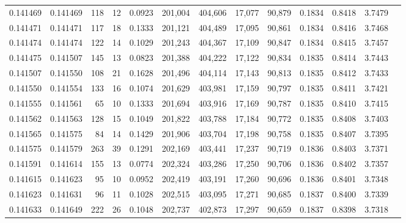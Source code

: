 \begin{tabular}{rrrrrrrrrrrrr}
0.141469 & 0.141469 &   118 &  12 &                                     0.0923 & 201,004 & 404,606 &  17,077 &  90,879 & 0.1834 & 0.8418 & 3.7479 \\
0.141471 & 0.141471 &   117 &  18 &                                     0.1333 & 201,121 & 404,489 &  17,095 &  90,861 & 0.1834 & 0.8416 & 3.7468 \\
0.141474 & 0.141474 &   122 &  14 &                                     0.1029 & 201,243 & 404,367 &  17,109 &  90,847 & 0.1834 & 0.8415 & 3.7457 \\
0.141475 & 0.141507 &   145 &  13 &                                     0.0823 & 201,388 & 404,222 &  17,122 &  90,834 & 0.1835 & 0.8414 & 3.7443 \\
0.141507 & 0.141550 &   108 &  21 &                                     0.1628 & 201,496 & 404,114 &  17,143 &  90,813 & 0.1835 & 0.8412 & 3.7433 \\
0.141550 & 0.141554 &   133 &  16 &                                     0.1074 & 201,629 & 403,981 &  17,159 &  90,797 & 0.1835 & 0.8411 & 3.7421 \\
0.141555 & 0.141561 &    65 &  10 &                                     0.1333 & 201,694 & 403,916 &  17,169 &  90,787 & 0.1835 & 0.8410 & 3.7415 \\
0.141562 & 0.141563 &   128 &  15 &                                     0.1049 & 201,822 & 403,788 &  17,184 &  90,772 & 0.1835 & 0.8408 & 3.7403 \\
0.141565 & 0.141575 &    84 &  14 &                                     0.1429 & 201,906 & 403,704 &  17,198 &  90,758 & 0.1835 & 0.8407 & 3.7395 \\
0.141575 & 0.141579 &   263 &  39 &                                     0.1291 & 202,169 & 403,441 &  17,237 &  90,719 & 0.1836 & 0.8403 & 3.7371 \\
0.141591 & 0.141614 &   155 &  13 &                                     0.0774 & 202,324 & 403,286 &  17,250 &  90,706 & 0.1836 & 0.8402 & 3.7357 \\
0.141615 & 0.141623 &    95 &  10 &                                     0.0952 & 202,419 & 403,191 &  17,260 &  90,696 & 0.1836 & 0.8401 & 3.7348 \\
0.141623 & 0.141631 &    96 &  11 &                                     0.1028 & 202,515 & 403,095 &  17,271 &  90,685 & 0.1837 & 0.8400 & 3.7339 \\
0.141633 & 0.141649 &   222 &  26 &                                     0.1048 & 202,737 & 402,873 &  17,297 &  90,659 & 0.1837 & 0.8398 & 3.7318 \\

\end{tabular}
